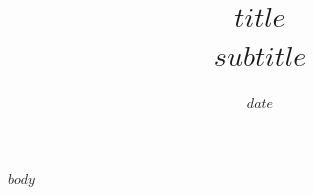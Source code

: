 \documentclass[11pt,letterpaper]{article}
\title{\LARGE $title$\\[0.45em]\large $subtitle$}
\author{}
\date{\small $date$}
\begin{document}
\maketitle
$body$
\end{document}
